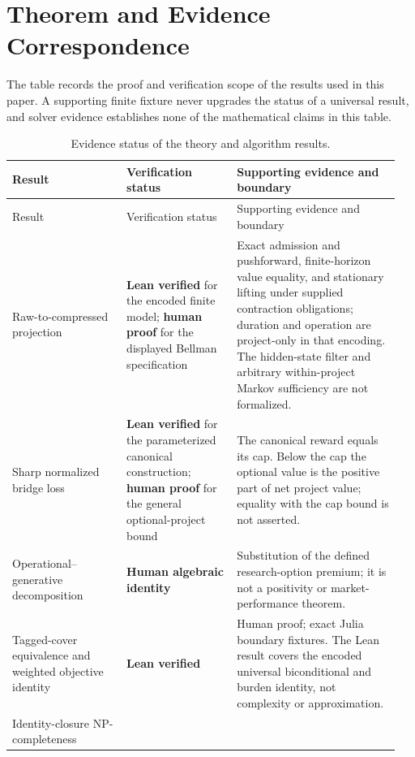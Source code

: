 \clearpage
\section{Theorem and Evidence Correspondence}
\label{sec:or-theorem-evidence}

The table records the proof and verification scope of the results used in this paper. A supporting finite fixture never upgrades the
status of a universal result, and solver evidence establishes none of the
mathematical claims in this table.

\begingroup
\small
\setlength{\tabcolsep}{3pt}
\begin{longtable}{@{}>{\raggedright\arraybackslash}p{0.28\linewidth}>{\raggedright\arraybackslash}p{0.27\linewidth}>{\raggedright\arraybackslash}p{0.40\linewidth}@{}}
\caption{Evidence status of the theory and algorithm results.}
\label{tab:or-theorem-evidence}\\
\toprule
Result & Verification status & Supporting evidence and boundary \\
\midrule
\endfirsthead
\toprule
Result & Verification status & Supporting evidence and boundary \\
\midrule
\endhead
Raw-to-compressed projection &
\textbf{Lean verified} for the encoded finite model; \textbf{human proof}
for the displayed Bellman specification & Exact admission and pushforward,
finite-horizon value equality, and stationary lifting under supplied contraction
obligations; duration and operation are project-only in that encoding. The
hidden-state filter and arbitrary within-project Markov
sufficiency are not formalized. \\
Sharp normalized bridge loss &
\textbf{Lean verified} for the parameterized canonical construction;
\textbf{human proof} for the general optional-project bound & The canonical
reward equals its cap. Below the cap the optional value is the positive part
of net project value; equality with the cap bound is not asserted. \\
Operational--generative decomposition &
\textbf{Human algebraic identity} & Substitution of the defined research-option
premium; it is not a positivity or market-performance theorem. \\
Tagged-cover equivalence and weighted objective identity &
\textbf{Lean verified} & Human proof; exact Julia boundary fixtures. The Lean
result covers the encoded universal biconditional and burden identity, not
complexity or approximation. \\
Identity-closure NP-completeness &

\end{longtable}
